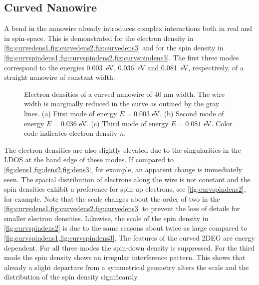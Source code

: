 \subsection{Curved Nanowire}
A bend in the nanowire already introduces complex interactions both in real and in spin-space. This is demonstrated for the electron density in \cref{fig:curvedens1,fig:curvedens2,fig:curvedens3} and for the spin density in \cref{fig:curvspindens1,fig:curvspindens2,fig:curvspindens3}. The first three modes correspond to the energies 0.003~eV, 0.036~eV and 0.081~eV, respectively, of a straight nanowire of constant width.\par
\begin{figure}[h!]
  \centering
  \caption{Electron densities of a curved nanowire of 40 nm width. The wire width is marginally reduced in the curve as outined by the gray lines. (a) First mode of energy $E=0.003$ eV. (b) Second mode of energy $E=0.036$ eV. (c) Third mode of energy $E=0.081$ eV. Color code indicates electron density $n$.}
\end{figure}
The electron densities are also slightly elevated due to the singularities in the LDOS at the band edge of these modes. If compared to \cref{fig:dens1,fig:dens2,fig:dens3}, for example, an apparent change is immediately seen. The spacial distribution of electrons along the wire is not constant and the spin densities exhibit a preference for spin-up electrons, see \cref{fig:curvspindens2}, for example. Note that the scale changes about the order of two in the \cref{fig:curvedens1,fig:curvedens2,fig:curvedens3} to prevent the loss of details for smaller electron densities. Likewise, the scale of the spin density in \cref{fig:curvspindens2} is due to the same reasons about twice as large compared to \cref{fig:curvspindens1,fig:curvspindens3}. The features of the curved 2DEG are energy dependent. For all three modes the spin-down density is suppressed. For the third mode the spin density shows an irregular interference pattern. This shows that already a slight departure from a symmetrical geometry alters the scale and the distribution of the spin density significantly.\par
